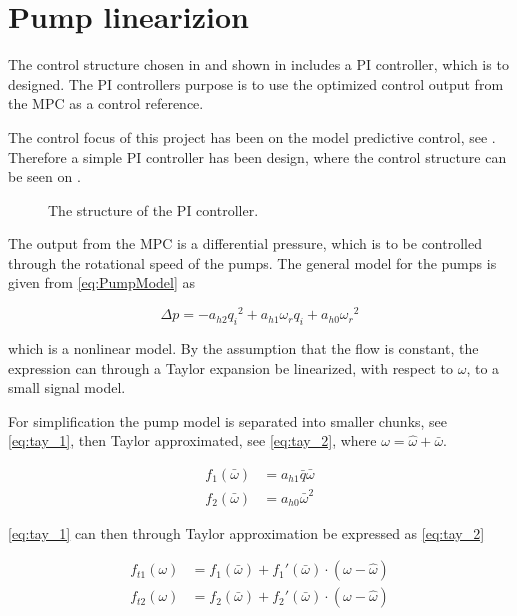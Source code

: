 \chapter{Pump linearizion}
\label{cha:linear_pump}

The control structure chosen in  and shown in  includes a PI controller, which is to designed. The PI controllers purpose is to use the optimized control output from the MPC as a control reference. 

The control focus of this project has been on the model predictive control, see . Therefore a simple PI controller has been design, where the control structure can be seen on .

\begin{figure}[H]
\centering
  
\caption{The structure of the PI controller.}
\label{fig:simple_PI}
\end{figure}

The output from the MPC is a differential pressure, which is to be controlled through the rotational speed of the pumps. The general model for the pumps is given from \eqref{eq:PumpModel} as 

\begin{equation*}
\Delta p = -a_{h2}{q_i}^2 + a_{h1} \omega_r q_i + a_{h0}{\omega_r}^2
\end{equation*}

which is a nonlinear model. By the assumption that the flow is constant, the expression can through a Taylor expansion be linearized, with respect to $\omega$, to a small signal model.


For simplification the pump model is separated into smaller chunks, see \eqref{eq:tay_1}, then Taylor approximated, see \eqref{eq:tay_2}, where $\omega = \hat{\omega}+\bar{\omega}$.

\begin{equation}
\begin{split}
f_1(\bar{\omega}) &= a_{h1}\bar{q}\bar{\omega} \\
f_2(\bar{\omega}) &= a_{h0}\bar{\omega}^2
\end{split}
\label{eq:tay_1}
\end{equation}

\eqref{eq:tay_1} can then through Taylor approximation be expressed as \eqref{eq:tay_2}

\begin{equation}
\begin{split}
f_{t1}(\omega) &= f_1(\bar{\omega}) + f_1'(\bar{\omega})\cdot(\omega - \hat{\omega}) \\
f_{t2}(\omega) &= f_2(\bar{\omega}) + f_2'(\bar{\omega})\cdot(\omega - \hat{\omega})
\end{split}
\label{eq:tay_2}
\end{equation}


